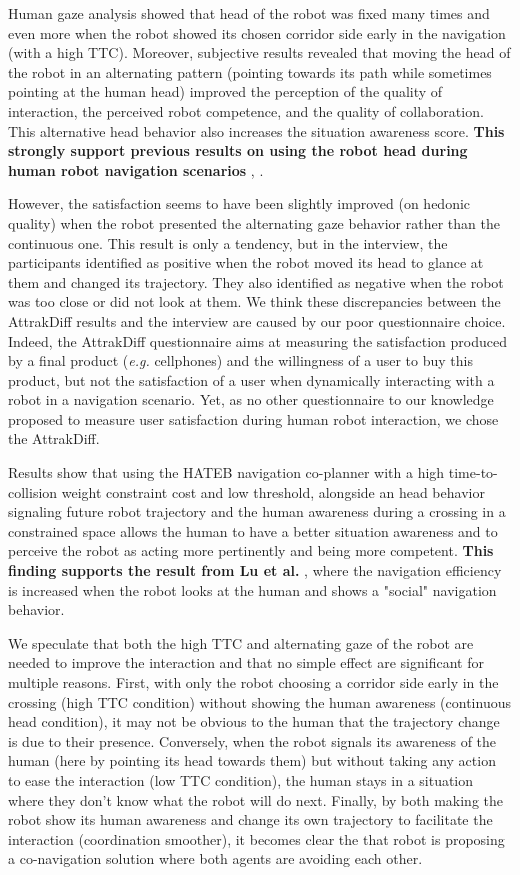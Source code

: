 \documentclass[a4paper,11pt,twoside]{StyleThese}
\begin{document}
Human gaze analysis showed that head of the robot was fixed many times and even more when the robot showed its chosen corridor side early in the navigation (with a high TTC). Moreover, subjective results revealed that moving the head of the robot in an alternating pattern (pointing towards its path while sometimes pointing at the human head) improved the perception of the quality of interaction, the perceived robot competence, and the quality of collaboration. This alternative head behavior also increases the situation awareness score. \textbf{This strongly support previous results on using the robot head during human robot navigation scenarios} \cite{khambhaita_head-body_2016}, \cite{may_show_2015}.

However, the satisfaction seems to have been slightly improved (on hedonic quality) when the robot presented the alternating gaze behavior rather than the continuous one. This result is only a tendency, but in the interview, the participants identified as positive when the robot moved its head to glance at them and changed its trajectory. They also identified as negative when the robot was too close or did not look at them. We think these discrepancies between the AttrakDiff results and the interview are caused by our poor questionnaire choice. Indeed, the AttrakDiff questionnaire aims at measuring the satisfaction produced by a final product (\textit{e.g.} cellphones) and the willingness of a user to buy this product, but not the satisfaction of a user when dynamically interacting with a robot in a navigation scenario. Yet, as no other questionnaire to our knowledge proposed to measure user satisfaction during human robot interaction, we chose the AttrakDiff.

Results show that using the HATEB navigation co-planner with a high time-to-collision weight constraint cost and low threshold, alongside an head behavior signaling future robot trajectory and the human awareness during a crossing in a constrained space allows the human to have a better situation awareness and to perceive the robot as acting more pertinently and being more competent. \textbf{This finding supports the result from Lu et al.} \cite{lu_towards_2013}, where the navigation efficiency is increased when the robot looks at the human and shows a "social" navigation behavior.

We speculate that both the high TTC and alternating gaze of the robot are needed to improve the interaction and that no simple effect are significant for multiple reasons. First, with only the robot choosing a corridor side early in the crossing (high TTC condition) without showing the human awareness (continuous head condition), it may not be obvious to the human that the trajectory change is due to their presence. Conversely, when the robot signals its awareness of the human (here by pointing its head towards them) but without taking any action to ease the interaction (low TTC condition), the human stays in a situation where they don't know what the robot will do next. Finally, by both making the robot show its human awareness and change its own trajectory to facilitate the interaction (coordination smoother), it becomes clear the that robot is proposing a co-navigation solution where both agents are avoiding each other.
\end{document}
